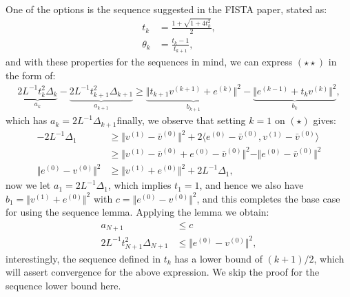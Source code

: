 \documentclass[]{article}
\theoremstyle{definition}
\begin{document}
        One of the options is the sequence suggested in the FISTA paper, stated as: 
        \begin{align*}
            t_k &= \frac{1 + \sqrt{1 + 4t_k^2}}{2}, 
            \\
            \theta_k &= \frac{t_k - 1}{t_{k + 1}}, 
            \tag{$\star \star *$}
        \end{align*}
        and with these properties for the sequences in mind, we can express $(\star\star)$ in the form of:
        \begin{align*}
            \underbrace{2L^{-1}t_k^2\Delta_k}_{a_k} - \underbrace{2L^{-1}t_{k + 1}^2\Delta_{k + 1}}_{a_{k + 1}}
            \ge 
            \underbrace{\Vert t_{k + 1}v^{(k + 1)} + e^{(k)}\Vert^2}_{b_{k + 1}}
            - 
            \underbrace{\Vert e^{(k - 1)} + t_k  v^{(k)} \Vert^2}_{b_{k}}, 
        \end{align*}
        which has $a_k = 2L^{-1}\Delta_{k + 1}$finally, we observe that setting $k = 1$ on $(\star)$ gives: 
        \begin{align*}
            -2L^{-1}  \Delta_1
            & \ge 
            \Vert v^{(1)} - \bar v^{(0)}\Vert^2 + 
            2\langle e^{(0)} - \bar v^{(0)}, v^{(1)} - \bar v^{(0)}\rangle
            \\
            &\ge
            \Vert 
                v^{(1)} - \bar v^{(0)}
                + 
                e^{(0)} - \bar v^{(0)}
            \Vert^2
            - 
            \Vert 
                e^{(0)} - \bar v^{(0)}
            \Vert^2
            \\
            \Vert e^{(0)} - v^{(0)}\Vert^2
            & \ge 
            \Vert v^{(1)} + e^{(0)}\Vert^2 + 2L^{-1}\Delta_1, 
        \end{align*}
        now we let $a_1 = 2L^{-1}\Delta_1$, which implies $t_1 = 1$, and hence we also have $b_1 = \Vert v^{(1)} + e^{(0)}\Vert^2$ with $c = \Vert e^{(0)} - v^{(0)}\Vert^2$, and this completes the base case for using the sequence lemma. Applying the lemma we obtain: 
        \begin{align*}
            a_{N + 1} &\le c
            \\
            2L^{-1}t_{N + 1}^2\Delta_{N + 1} &\le \Vert e^{(0)} - v^{(0)}\Vert^2, 
        \end{align*}
        interestingly, the sequence defined in $t_k$ has a lower bound of $(k + 1)/2$, which will assert convergence for the above expression. We skip the proof for the sequence lower bound here. 



\end{document}
